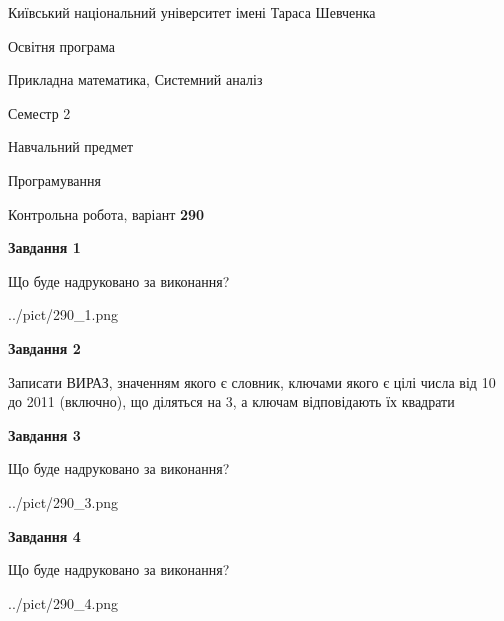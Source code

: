 \documentclass[12pt, ukrainian]{article}
\begin{document}
{{\begin {small}\par
{ \center  Київський національний університет імені Тараса Шевченка \par}
{\parbox {5 cm}{Освітня програма \hfill}{\parbox {8 cm}{Прикладна математика, Системний аналіз \hfill}}\parbox {5 cm}{\hfill Семестр 2}}\par
{\parbox {5 cm} {Навчальний предмет \hfill}\parbox {7 cm}{Програмування \hfill}\parbox {6cm}{\hfill}\par}\vspace{-7pt} \end{small}}{\center Контрольна робота, варіант  \No \textbf
{ 290 }\par}}
{
\begin {large}
{\begin {center}\textbf{Завдання 1}\end {center}}\par
Що буде надруковано за виконання?\par\par
\begin{center}
	{../pict/290_1.png}
\end{center}
\newpage

{\begin {center}\textbf{Завдання 2}\end {center}}\par
Записати ВИРАЗ, значенням якого є словник, ключами якого є цілі числа від 10 до 2011 (включно), що діляться на 3, а ключам відповідають їх квадрати\par
\newpage

{\begin {center}\textbf{Завдання 3}\end {center}}\par
Що буде надруковано за виконання?\par
\begin{center}
	{../pict/290_3.png}
\end{center}
\newpage

{\begin {center}\textbf{Завдання 4}\end {center}}\par
Що буде надруковано за виконання?\par
\begin{center}
	{../pict/290_4.png}
\end{center}
\newpage


\end{large}}
\end{document}
